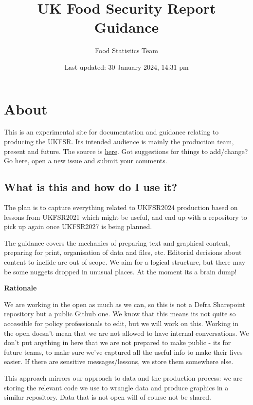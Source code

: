 \documentclass[
]{book}
\title{UK Food Security Report Guidance}
\author{Food Statistics Team}
\date{Last updated: 30 January 2024, 14:31 pm}
\begin{document}
\maketitle

{
\setcounter{tocdepth}{1}
\tableofcontents
}
\hypertarget{about}{%
\chapter{About}\label{about}}

This is an experimental site for documentation and guidance relating to
producing the UKFSR. Its intended audience is mainly the production team,
present and future. The source is
\href{https://github.com/FoodchainStats/ukfsr-docs}{here}. Got suggestions for things
to add/change? Go \href{https://github.com/FoodchainStats/ukfsr-docs/issues}{here},
open a new issue and submit your comments.

\hypertarget{what-is-this-and-how-do-i-use-it}{%
\section{What is this and how do I use it?}\label{what-is-this-and-how-do-i-use-it}}

The plan is to capture everything related to UKFSR2024 production based on
lessons from UKFSR2021 which might be useful, and end up with a repository to
pick up again once UKFSR2027 is being planned.

The guidance covers the mechanics of preparing text and graphical content,
preparing for print, organisation of data and files, etc. Editorial decisions
about content to inclide are out of scope. We aim for a logical structure, but
there may be some nuggets dropped in unusual places. At the moment its a brain
dump!

\textbf{Rationale}

We are working in the open as much as we can, so this is not a Defra Sharepoint
repository but a public Github one. We know that this means its not quite so
accessible for policy professionals to edit, but we will work on this. Working
in the open doesn't mean that we are not allowed to have internal conversations.
We don't put anything in here that we are not prepared to make public - its for
future teams, to make sure we've captured all the useful info to make their
lives easier. If there are sensitive messages/lessons, we store them somewhere
else.

This approach mirrors our approach to data and the production process: we are
storing the relevant code we use to wrangle data and produce graphics in a
similar repository. Data that is not open will of course not be shared.
\end{document}
